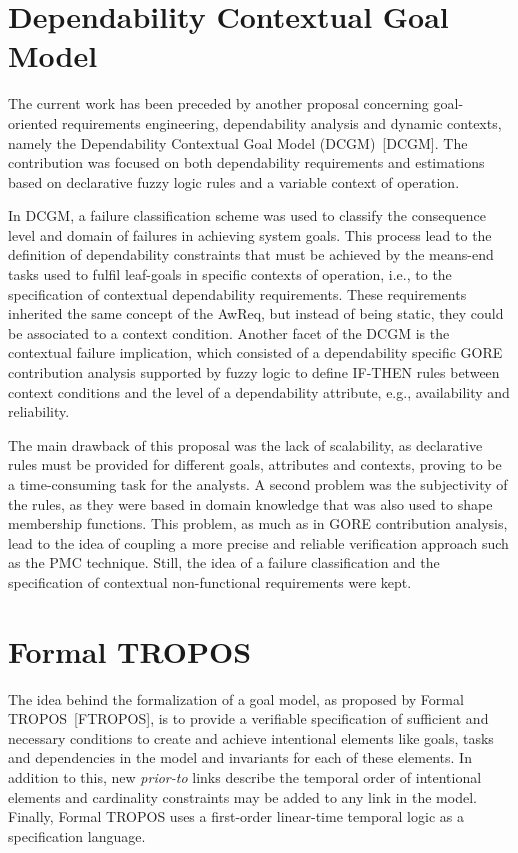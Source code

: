 \section{Dependability Contextual Goal Model}

The current work has been preceded by another proposal concerning goal-oriented requirements engineering, dependability analysis and dynamic contexts, namely the Dependability Contextual Goal Model (DCGM)~[DCGM]. The contribution was focused on both dependability requirements and estimations based on declarative fuzzy logic rules and a variable context of operation.

In DCGM, a failure classification scheme was used to classify the consequence level and domain of failures in achieving system goals. This process lead to the definition of dependability constraints that must be achieved by the means-end tasks used to fulfil leaf-goals in specific contexts of operation, i.e., to the specification of contextual dependability requirements. These requirements inherited the same concept of the AwReq, but instead of being static, they could be associated to a context condition. Another facet of the DCGM is the contextual failure implication, which consisted of a dependability specific GORE contribution analysis supported by fuzzy logic to define IF-THEN rules between context conditions and the level of a dependability attribute, e.g., availability and reliability.

The main drawback of this proposal was the lack of scalability, as declarative rules must be provided for different goals, attributes and contexts, proving to be a time-consuming task for the analysts. A second problem was the subjectivity of the rules, as they were based in domain knowledge that was also used to shape membership functions. This problem, as much as in GORE contribution analysis, lead to the idea of coupling a more precise and reliable verification approach such as the PMC technique. Still, the idea of a failure classification and the specification of contextual non-functional requirements were kept.

\section{Formal TROPOS}

The idea behind the formalization of a goal model, as proposed by Formal TROPOS~[FTROPOS], is to provide a verifiable specification of sufficient and necessary conditions to create and achieve intentional elements like goals, tasks and dependencies in the model and invariants for each of these elements. In addition to this, new \textit{prior-to} links describe the temporal order of intentional elements and cardinality constraints may be added to any link in the model. Finally, Formal TROPOS uses a first-order linear-time temporal logic as a specification language.

